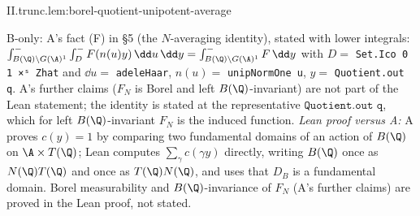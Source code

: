 \begin{tfformal}{II.trunc.lem:borel-quotient-unipotent-average}
\begin{tffidelity}
B-only: A's fact (F) in §5 (the $N$-averaging identity), stated with lower integrals: $\int^-_{B(\Q)\backslash G(\A)^1}\int^-_{D}F(n(u)y)\,\dd u\,\dd y=\int^-_{B(\Q)\backslash G(\A)^1}F\,\dd y$ with $D=$ \texttt{Set.Ico 0 1 ×ˢ Zhat} and $\dd u=$ \texttt{adeleHaar}, $n(u)=$ \texttt{unipNormOne u}, $y=$ \texttt{Quotient.out q}. A's further claims ($F_N$ is Borel and left $B(\Q)$-invariant) are not part of the Lean statement; the identity is stated at the representative $\texttt{Quotient.out q}$, which for left $B(\Q)$-invariant $F_N$ is the induced function. \emph{Lean proof versus A:} A proves $c(y)=1$ by comparing two fundamental domains of an action of $B(\Q)$ on $\A\times T(\Q)$; Lean computes $\sum_\gamma c(\gamma y)$ directly, writing $B(\Q)$ once as $N(\Q)T(\Q)$ and once as $T(\Q)N(\Q)$, and uses that $D_B$ is a fundamental domain. Borel measurability and $B(\Q)$-invariance of $F_N$ (A's further claims) are proved in the Lean proof, not stated.
\end{tffidelity}
\end{tfformal}
